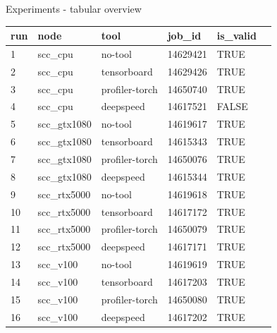 \documentclass[compress,aspectratio=169]{beamer}
\begin{document}
\begin{frame}{Experiments - tabular overview}
\scriptsize{
\begin{table}[]
\begin{tabular}{@{}llllll@{}}
\toprule
run & node         & tool           & job\_id  & is\_valid  \\ \midrule
1   & scc\_cpu     & no-tool        & 14629421 & TRUE                  \\
2   & scc\_cpu     & tensorboard    & 14629426 & TRUE                  \\
3   & scc\_cpu     & profiler-torch & 14650740 & TRUE                  \\
4   & scc\_cpu     & deepspeed      & 14617521 & FALSE                 \\
5   & scc\_gtx1080 & no-tool        & 14619617 & TRUE                  \\
6   & scc\_gtx1080 & tensorboard    & 14615343 & TRUE                  \\
7   & scc\_gtx1080 & profiler-torch & 14650076 & TRUE                  \\
8   & scc\_gtx1080 & deepspeed      & 14615344 & TRUE                  \\
9   & scc\_rtx5000 & no-tool        & 14619618 & TRUE                  \\
10  & scc\_rtx5000 & tensorboard    & 14617172 & TRUE                  \\
11  & scc\_rtx5000 & profiler-torch & 14650079 & TRUE                  \\
12  & scc\_rtx5000 & deepspeed      & 14617171 & TRUE                  \\
13  & scc\_v100    & no-tool        & 14619619 & TRUE                  \\
14  & scc\_v100    & tensorboard    & 14617203 & TRUE                  \\
15  & scc\_v100    & profiler-torch & 14650080 & TRUE                  \\
16  & scc\_v100    & deepspeed      & 14617202 & TRUE                 
\end{tabular}
\end{table}
}
\end{frame}
\end{document}
